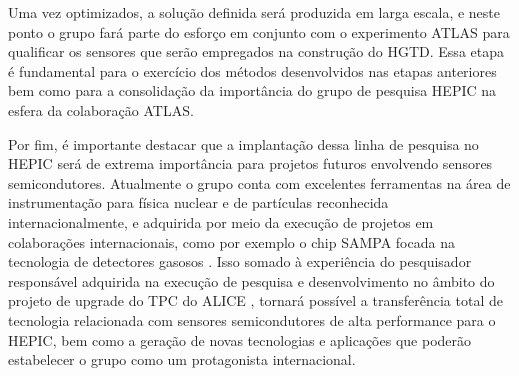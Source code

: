 Uma vez optimizados, a solução definida será produzida em larga escala, e neste ponto o grupo fará parte do esforço em conjunto com o experimento ATLAS para qualificar os sensores que serão empregados na construção do HGTD. Essa etapa é fundamental para o exercício dos métodos desenvolvidos nas etapas anteriores bem como para a consolidação da importância do grupo de pesquisa HEPIC na esfera da colaboração ATLAS.



Por fim, é importante destacar que a implantação dessa linha de pesquisa no HEPIC será de extrema importância para projetos futuros envolvendo sensores semicondutores. Atualmente o grupo conta com excelentes ferramentas na área de instrumentação para física nuclear e de partículas reconhecida internacionalmente, e adquirida por meio da execução de projetos em colaborações internacionais, como por exemplo o chip SAMPA focada na tecnologia de detectores gasosos \cite{ref1}. Isso somado à experiência do pesquisador responsável adquirida na execução de pesquisa e desenvolvimento no âmbito do projeto de upgrade do TPC do ALICE \cite{tpcNIM,discharge_paper}, tornará possível a transferência total de tecnologia relacionada com sensores semicondutores de alta performance para o HEPIC, bem como a geração de novas tecnologias e aplicações que poderão estabelecer o grupo como um protagonista internacional.
